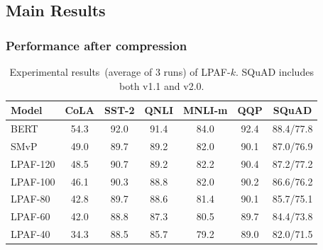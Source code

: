 \subsection{Main Results}
\label{sec:main}
\subsubsection{Performance after compression}
\begin{table}[h]
	\centering
	\scriptsize
	\begin{tabular}{|l|cccccc|}
		\hline
		Model &CoLA & SST-2 & QNLI & MNLI-m & QQP  & SQuAD  \\
		\hline
		BERT &54.3 &92.0 &91.4 &84.0 &92.4 &88.4/77.8 \\
		SMvP   &49.0   & 89.7  & 89.2 & 82.0 & 90.1 & 87.0/76.9  \\
		\hline
		LPAF-120& 48.5 & 90.7  & 89.2 & 82.2 & 90.4 & 87.2/77.2  \\
		LPAF-100&46.1  & 90.3  & 88.8 & 82.0 & 90.2 & 86.6/76.2  \\
		LPAF-80& 42.8  & 89.7  & 88.6 & 81.4 & 90.1 & 85.7/75.1  \\
		LPAF-60 &42.0  & 88.8  & 87.3 & 80.5 & 89.7 & 84.4/73.8  \\
		LPAF-40 &34.3  & 88.5  & 85.7 & 79.2 & 89.0 & 82.0/71.5 \\
		\hline
	\end{tabular}
	\caption{Experimental results~(average of 3 runs) of LPAF-$k$. SQuAD includes both v1.1 and v2.0.}
	\label{table:diffk}
\end{table}









